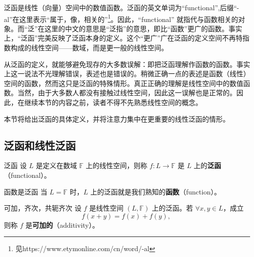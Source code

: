 
\cite{Ke1}泛函是线性（向量）空间中的数值函数。泛函的英文单词为“functional”,后缀“-al”在这里表示“属于，像，相关的”\footnote{见https://www.etymonline.com/cn/word/-al}。因此，“functional” 就指代与函数相关的对象。而“泛”在这里的中文的意思是“泛指”的意思，即比“函数”更广的函数。事实上，“泛函”完美反映了泛函本身的定义。这个“更广”广在泛函的定义空间不再特指数构成的线性空间——数域，而是更一般的线性空间。

从泛函的定义，就能够避免现存的大多数误解：即把泛函理解作函数的函数。事实上这一说法不光理解错误，表述也是错误的。稍微正确一点的表述是函数（线性）空间的函数，然而这只是泛函的特殊情形。真正正确的理解是线性空间中的数值函数。当然，由于大多数人都没有接触过线性空间，因此这一误解也是正常的。因此，在继续本节的内容之前，读者不得不先熟悉线性空间的概念。

本节将给出泛函的具体定义，并将注意力集中在更重要的线性泛函的情形。

\subsection{泛函和线性泛函}
\begin{definition}{泛函}
设 $L$ 是定义在数域 $\mathbb F$ 上的线性空间，则称 $f:L\rightarrow\mathbb F$ 是 $L$ 上的\textbf{泛函}（functional）。
\end{definition}

\begin{example}{函数是泛函}
当 $L=\mathbb F$ 时，$L$ 上的泛函就是我们熟知的\textbf{函数}（function）。
\end{example}

\begin{definition}{可加，齐次，共轭齐次}
设 $f$ 是线性空间 $(L,\mathbb F)$ 上的泛函。若 $\forall x,y\in L$，成立
\begin{equation}
f(x+y)=f(x)+f(y),~
\end{equation}
则称 $f$ 是\textbf{可加的}（additivity）。
\end{definition}











